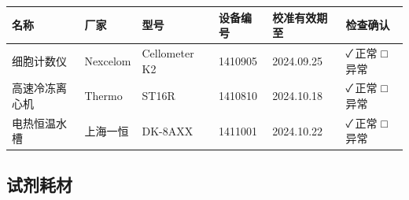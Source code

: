 \documentclass[UTF8,10pt,a4paper,fontset=fandol]{ctexart}
\newcommand{\fieldvalue}[1]{#1}
\newcommand{\handwritten}[1]{#1}
\begin{document}
\begin{tabularx}{\textwidth}{|p{2.4cm}|p{2.2cm}|p{2.5cm}|p{2.1cm}|p{2.3cm}|X|}
\hline
名称 & 厂家 & 型号 & 设备编号 & 校准有效期至 & 检查确认 \\ \hline
\fieldvalue{细胞计数仪} &
\fieldvalue{Nexcelom} &
\fieldvalue{Cellometer K2} &
\fieldvalue{1410905} &
\fieldvalue{\handwritten{2024.09.25}} &
\fieldvalue{\handwritten{✓}\,正常 \quad □异常}
\\ \hline
\fieldvalue{高速冷冻离心机} &
\fieldvalue{Thermo} &
\fieldvalue{ST16R} &
\fieldvalue{1410810} &
\fieldvalue{\handwritten{2024.10.18}} &
\fieldvalue{\handwritten{✓}\,正常 \quad □异常}
\\ \hline
\fieldvalue{电热恒温水槽} &
\fieldvalue{上海一恒} &
\fieldvalue{DK-8AXX} &
\fieldvalue{1411001} &
\fieldvalue{\handwritten{2024.10.22}} &
\fieldvalue{\handwritten{✓}\,正常 \quad □异常}
\\ \hline
\end{tabularx}

\subsection{试剂耗材}
\end{document}
